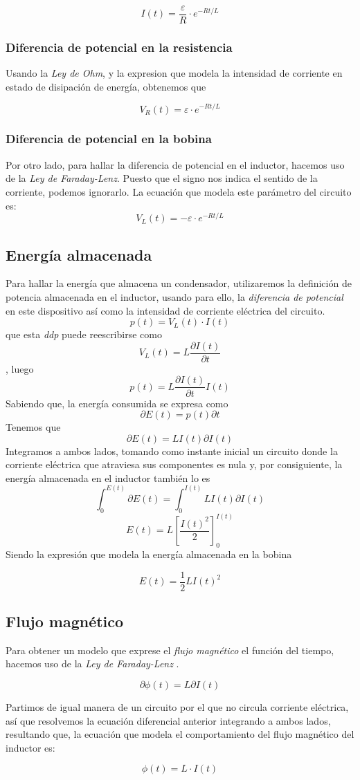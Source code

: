 \documentclass[../main.tex]{subfiles}
\begin{document}
$$I(t) = \frac{\varepsilon}{R} \cdot e^{-Rt/L}$$


\subsubsection{Diferencia de potencial en la resistencia}
\label{part::descarga_inductor_2}
Usando la \textit{Ley de Ohm}, y la expresion que modela la intensidad de corriente en estado de disipación de energía, obtenemos que

$$V_R(t) = \varepsilon \cdot e^{-Rt/L}$$

\subsubsection{Diferencia de potencial en la bobina}
\label{part::descarga_inductor_3}
Por otro lado, para hallar la diferencia de potencial en el inductor, hacemos uso de la \textit{Ley de Faraday-Lenz}. Puesto que el signo nos indica el sentido de la corriente, podemos ignorarlo. La ecuación que modela este parámetro del circuito es:
$$V_L(t) = -\varepsilon \cdot e^{-Rt/L}$$

\subsection{Energía almacenada}
\label{part::energía_inductor}
Para hallar la energía que almacena un condensador, utilizaremos la definición de potencia almacenada en el inductor, usando para ello, la \textit{diferencia de potencial} en este dispositivo así como la intensidad de corriente eléctrica del circuito.
$$p(t) = V_L(t) \cdot I(t)$$
que esta \textit{ddp} puede reescribirse como
$$V_L(t) = L \frac{\partial I(t)}{\partial t}$$
, luego
$$p(t) = L \frac{\partial I(t)}{\partial t} I(t)$$
Sabiendo que, la energía consumida se expresa como
$$\partial E(t) = p(t) \partial t$$
Tenemos que
$$\partial E(t) = L I(t) \partial I(t)$$
Integramos a ambos lados, tomando como instante inicial un circuito donde la corriente eléctrica que atraviesa sus componentes es nula y, por consiguiente, la energía almacenada en el inductor también lo es
$$\int_0^{E(t)} \partial E(t) = \int_0^{I(t)} L I(t) \partial I(t)$$
$$E(t) = L \left[ \frac{I(t)^2}{2}\right]_0^{I(t)}$$
Siendo la expresión que modela la energía almacenada en la bobina

$$E(t) = \frac{1}{2}L I(t)^2$$

\subsection{Flujo magnético}
\label{part::flujo_magnetico_inductor}
Para obtener un modelo que exprese el \textit{flujo magnético} el función del tiempo, hacemos uso de la \textit{Ley de Faraday-Lenz} . 

$$\partial \phi(t) = L \partial I(t)$$

Partimos de igual manera de un circuito por el que no circula corriente eléctrica, así que resolvemos la ecuación diferencial anterior integrando a ambos lados, resultando que, la ecuación que modela el comportamiento del flujo magnético del inductor es:

$$\phi(t) = L \cdot I(t)$$
\end{document}
